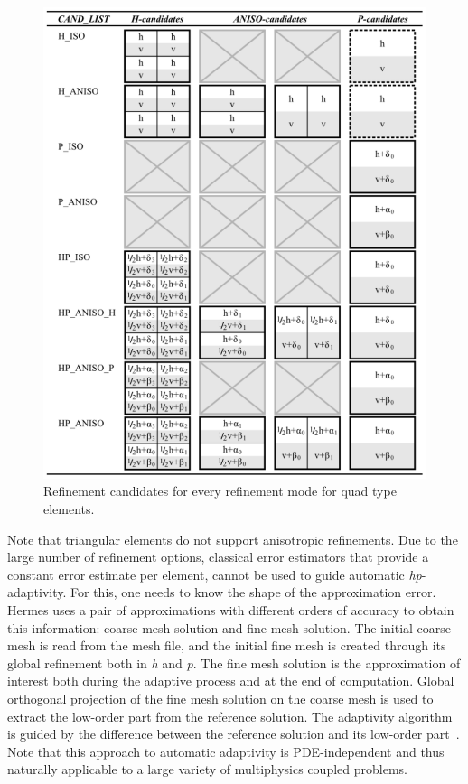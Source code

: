 \begin{figure}[!ht]
  \begin{centering}
  \includegraphics[width=0.7\columnwidth]{cand_list_quads}
  \caption{\label{fig:candlist} Refinement candidates for every
  refinement mode for quad type elements.}
  \end{centering}
\end{figure}
Note that triangular elements do not support anisotropic refinements.
Due to the large number of refinement options, classical error estimators 
that provide a constant error estimate per element, cannot be used to 
guide automatic \emph{hp}-adaptivity. 
For this, one needs to know the shape of the approximation error.
Hermes uses a pair of approximations with different orders of accuracy 
to obtain this information: coarse mesh solution and fine mesh solution. 
The initial coarse mesh is read from the mesh file, and the initial 
fine mesh is created through its global refinement both in \emph{h}
and \emph{p}. The fine mesh solution is the approximation of 
interest both during the adaptive process and at the end of computation. 
Global orthogonal projection of the fine mesh solution on the coarse mesh 
is used to extract the low-order part from the reference solution.
The adaptivity algorithm is guided by the difference between the 
reference solution and its low-order part~\cite{solin2010pde}.
Note that this approach to automatic adaptivity is PDE-independent
and thus naturally applicable to a large variety of multiphysics 
coupled problems.


